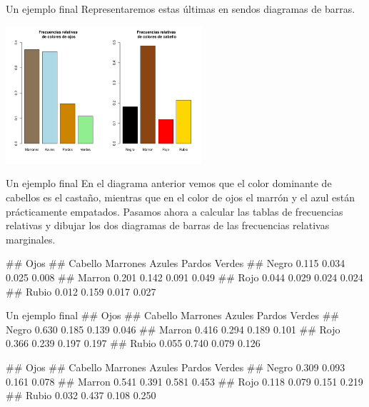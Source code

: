 \documentclass[
  ignorenonframetext,
  aspectratio=169]{beamer}
\let\oldverbatim\verbatim
\let\endoldverbatim\endverbatim
\renewenvironment{verbatim}{\tiny\oldverbatim}{\endoldverbatim}
\begin{document}
\begin{frame}{Un ejemplo final}
\protect\hypertarget{un-ejemplo-final-5}{}
Representaremos estas últimas en sendos diagramas de barras.

\begin{center}\includegraphics[width=275px]{Hora3_files/figure-beamer/unnamed-chunk-51-1} \end{center}
\end{frame}

\begin{frame}[fragile]{Un ejemplo final}
\protect\hypertarget{un-ejemplo-final-6}{}
En el diagrama anterior vemos que el color dominante de cabellos es el
castaño, mientras que en el color de ojos el marrón y el azul están
prácticamente empatados. Pasamos ahora a calcular las tablas de
frecuencias relativas y dibujar los dos diagramas de barras de las
frecuencias relativas marginales.

\begin{verbatim}
##         Ojos
## Cabello  Marrones Azules Pardos Verdes
##   Negro     0.115  0.034  0.025  0.008
##   Marron    0.201  0.142  0.091  0.049
##   Rojo      0.044  0.029  0.024  0.024
##   Rubio     0.012  0.159  0.017  0.027
\end{verbatim}
\end{frame}

\begin{frame}[fragile]{Un ejemplo final}
\protect\hypertarget{un-ejemplo-final-7}{}
\begin{verbatim}
##         Ojos
## Cabello  Marrones Azules Pardos Verdes
##   Negro     0.630  0.185  0.139  0.046
##   Marron    0.416  0.294  0.189  0.101
##   Rojo      0.366  0.239  0.197  0.197
##   Rubio     0.055  0.740  0.079  0.126
\end{verbatim}

\begin{verbatim}
##         Ojos
## Cabello  Marrones Azules Pardos Verdes
##   Negro     0.309  0.093  0.161  0.078
##   Marron    0.541  0.391  0.581  0.453
##   Rojo      0.118  0.079  0.151  0.219
##   Rubio     0.032  0.437  0.108  0.250
\end{verbatim}
\end{frame}
\end{document}
